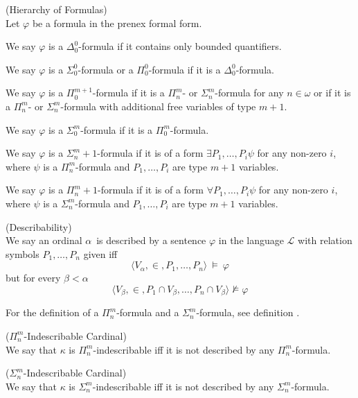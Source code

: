 \begin{definition}{(Hierarchy of Formulas)}\label{def:analytical_hierarchy}\\
Let $\varphi$ be a formula in the prenex formal form.
\bce[(i)]
\item We say $\varphi$ is a $\Delta^0_0$-formula if it contains only bounded quantifiers.
\item We say $\varphi$ is a $\Sigma^0_0$-formula or a $\Pi^0_0$-formula if it is a $\Delta^0_0$-formula.
\item We say $\varphi$ is a $\Pi^{m+1}_0$-formula if it is a $\Pi^m_n$- or $\Sigma^m_n$-formula for any $n \in \omega$ or if it is a $\Pi^m_n$- or $\Sigma^m_n$-formula with additional free variables of type $m+1$.
\item We say $\varphi$ is a $\Sigma^m_0$-formula if it is a $\Pi^m_0$-formula.
\item We say $\varphi$ is a $\Sigma^m_n+1$-formula if it is of a form $\exists P_1, \ldots, P_i \psi$ for any non-zero $i$, where $\psi$ is a $\Pi^m_n$-formula and $P_1, \ldots, P_i$ are type $m+1$ variables.
\item We say $\varphi$ is a $\Pi^m_n+1$-formula if it is of a form $\forall P_1, \ldots, P_i \psi$ for any non-zero $i$, where $\psi$ is a $\Sigma^m_n$-formula and $P_1, \ldots, P_i$ are type $m+1$ variables.
\ece
\end{definition}



\begin{definition}{(Describability)}\label{def:describability}\\
We say an ordinal $\alpha$ is described by a sentence $\varphi$ in the language $\mathscr{L}$ with relation symbols $P_1, \ldots, P_n$ given iff
\begin{equation}
\langle V_\alpha, \in, P_1, \ldots, P_n \rangle~\models~\varphi
\end{equation}
but for every $\beta < \alpha$
\begin{equation}
\langle V_\beta, \in, P_1 \cap V_\beta, \ldots, P_n \cap V_\beta \rangle \not\models \varphi
\end{equation}
\end{definition}

For the definition of a $\Pi^m_n$-formula and a $\Sigma^m_n$-formula, see definition .

\begin{definition}{($\Pi^m_n$-Indescribable Cardinal)}\label{def:pi_mn_indescribable}\\
We say that $\kappa$ is $\Pi^m_n$-indescribable iff it is not described by any $\Pi^m_n$-formula.
\end{definition}
\begin{definition}{($\Sigma^m_n$-Indescribable Cardinal)}\label{def:sigma_mn_indescribable}\\
We say that $\kappa$ is $\Sigma^m_n$-indescribable iff it is not described by any $\Sigma^m_n$-formula.
\end{definition}


